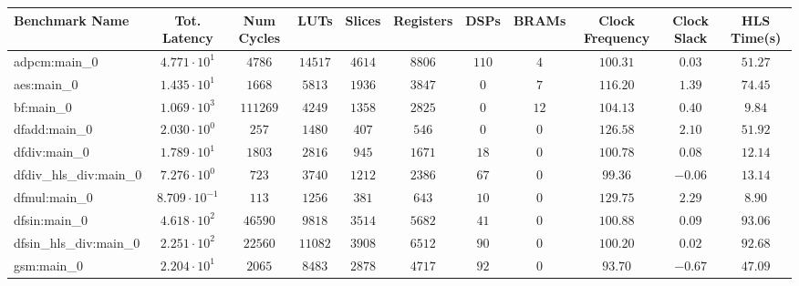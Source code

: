 \begin{tabular}{|l|c|c|c|c|c|c|c|c|c|c|}
\hline
Benchmark Name          & Tot. Latency            & Num Cycles & LUTs      & Slices    & Registers & DSPs    & BRAMs  & Clock Frequency & Clock Slack & HLS Time(s) \\
\hline
adpcm:main\_0           & $ 4.771 \cdot 10^{1}  $ & $ 4786   $ & $ 14517 $ & $ 4614  $ & $ 8806  $ & $ 110 $ & $ 4  $ & $ 100.31      $ & $ 0.03    $ & $ 51.27   $ \\
aes:main\_0             & $ 1.435 \cdot 10^{1}  $ & $ 1668   $ & $ 5813  $ & $ 1936  $ & $ 3847  $ & $ 0   $ & $ 7  $ & $ 116.20      $ & $ 1.39    $ & $ 74.45   $ \\
bf:main\_0              & $ 1.069 \cdot 10^{3}  $ & $ 111269 $ & $ 4249  $ & $ 1358  $ & $ 2825  $ & $ 0   $ & $ 12 $ & $ 104.13      $ & $ 0.40    $ & $ 9.84    $ \\
dfadd:main\_0           & $ 2.030 \cdot 10^{0}  $ & $ 257    $ & $ 1480  $ & $ 407   $ & $ 546   $ & $ 0   $ & $ 0  $ & $ 126.58      $ & $ 2.10    $ & $ 51.92   $ \\
dfdiv:main\_0           & $ 1.789 \cdot 10^{1}  $ & $ 1803   $ & $ 2816  $ & $ 945   $ & $ 1671  $ & $ 18  $ & $ 0  $ & $ 100.78      $ & $ 0.08    $ & $ 12.14   $ \\
dfdiv\_hls\_div:main\_0 & $ 7.276 \cdot 10^{0}  $ & $ 723    $ & $ 3740  $ & $ 1212  $ & $ 2386  $ & $ 67  $ & $ 0  $ & $ 99.36       $ & $ -0.06   $ & $ 13.14   $ \\
dfmul:main\_0           & $ 8.709 \cdot 10^{-1} $ & $ 113    $ & $ 1256  $ & $ 381   $ & $ 643   $ & $ 10  $ & $ 0  $ & $ 129.75      $ & $ 2.29    $ & $ 8.90    $ \\
dfsin:main\_0           & $ 4.618 \cdot 10^{2}  $ & $ 46590  $ & $ 9818  $ & $ 3514  $ & $ 5682  $ & $ 41  $ & $ 0  $ & $ 100.88      $ & $ 0.09    $ & $ 93.06   $ \\
dfsin\_hls\_div:main\_0 & $ 2.251 \cdot 10^{2}  $ & $ 22560  $ & $ 11082 $ & $ 3908  $ & $ 6512  $ & $ 90  $ & $ 0  $ & $ 100.20      $ & $ 0.02    $ & $ 92.68   $ \\
gsm:main\_0             & $ 2.204 \cdot 10^{1}  $ & $ 2065   $ & $ 8483  $ & $ 2878  $ & $ 4717  $ & $ 92  $ & $ 0  $ & $ 93.70       $ & $ -0.67   $ & $ 47.09   $ \\

\end{tabular}
